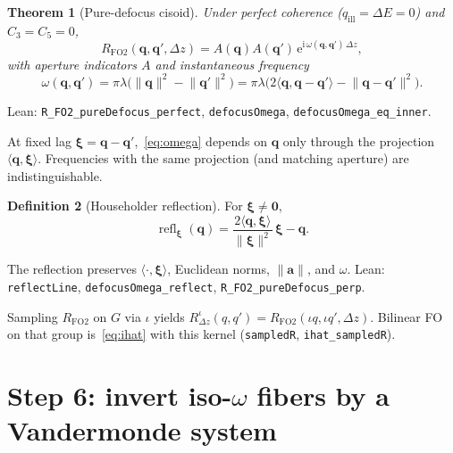 \documentclass[11pt,a4paper]{article}
\newtheorem{theorem}{Theorem}[section]
\theoremstyle{definition}
\newtheorem{definition}[theorem]{Definition}
\theoremstyle{remark}
\newcommand{\ee}{\mathrm{e}}
\newcommand{\ii}{\mathrm{i}}
\newcommand{\norm}[1]{\lVert#1\rVert}
\newcommand{\Dz}{\Delta z}
\newcommand{\RFOII}{R_{\mathrm{FO2}}}
\begin{document}
\begin{theorem}[Pure-defocus cisoid]
\label{thm:cisoid}
Under perfect coherence ($q_{\mathrm{ill}}=\Delta E=0$) and
$C_3=C_5=0$,
\begin{equation}
\label{eq:cisoid}
\RFOII(\mathbf{q},\mathbf{q}',\Dz)
=A(\mathbf{q})A(\mathbf{q}')\,
\ee^{\ii\,\omega(\mathbf{q},\mathbf{q}')\,\Dz},
\end{equation}
with aperture indicators $A$ and instantaneous frequency
\begin{equation}
\label{eq:omega}
\omega(\mathbf{q},\mathbf{q}')
=\pi\lambda\bigl(\norm{\mathbf{q}}^2-\norm{\mathbf{q}'}^2\bigr)
=\pi\lambda\bigl(2\langle\mathbf{q},\mathbf{q}-\mathbf{q}'\rangle
-\norm{\mathbf{q}-\mathbf{q}'}^2\bigr).
\end{equation}
\end{theorem}
Lean: \texttt{R\_FO2\_pureDefocus\_perfect}, \texttt{defocusOmega},
\texttt{defocusOmega\_eq\_inner}.

At fixed lag $\boldsymbol{\xi}=\mathbf{q}-\mathbf{q}'$,~\eqref{eq:omega}
depends on $\mathbf{q}$ only through the projection
$\langle\mathbf{q},\boldsymbol{\xi}\rangle$.
Frequencies with the same projection (and matching aperture) are
indistinguishable.

\begin{definition}[Householder reflection]
\label{def:refl}
For $\boldsymbol{\xi}\neq\mathbf{0}$,
\begin{equation}
\label{eq:refl}
\operatorname{refl}_{\boldsymbol{\xi}}(\mathbf{q})
=\frac{2\langle\mathbf{q},\boldsymbol{\xi}\rangle}{\norm{\boldsymbol{\xi}}^2}\,
\boldsymbol{\xi}-\mathbf{q}.
\end{equation}
\end{definition}
The reflection preserves $\langle\cdot,\boldsymbol{\xi}\rangle$, Euclidean
norms, $\norm{\mathbf{a}}$, and $\omega$.
Lean: \texttt{reflectLine}, \texttt{defocusOmega\_reflect},
\texttt{R\_FO2\_pureDefocus\_perp}.

Sampling $\RFOII$ on $G$ via $\iota$ yields
$R^\iota_{\Dz}(q,q')=\RFOII(\iota q,\iota q',\Dz)$.
Bilinear FO on that group is~\eqref{eq:ihat} with this kernel
(\texttt{sampledR}, \texttt{ihat\_sampledR}).

\section{Step 6: invert iso-\texorpdfstring{$\omega$}{omega} fibers by a Vandermonde system}
\label{sec:fiber}
\end{document}
